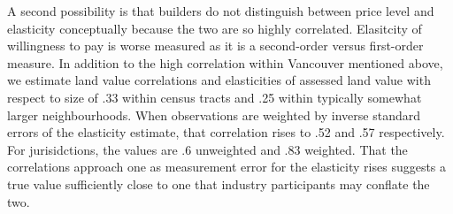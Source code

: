 \documentclass[12pt]{article}
\begin{document}
A second possibility is that builders do not distinguish between price level
and elasticity conceptually because the two are so highly correlated.
Elasitcity of willingness to pay is worse measured as it is a second-order
versus first-order measure. In addition to the high correlation within
Vancouver mentioned above, we estimate land value correlations and elasticities
of assessed land value with respect to size of .33 within census tracts and .25
within typically somewhat larger neighbourhoods. When observations are weighted
by inverse standard errors of the elasticity estimate, that correlation rises
to .52 and .57 respectively. For jurisidctions, the values are .6 unweighted
and .83 weighted. That the correlations approach one as measurement error for
the elasticity rises suggests a true value sufficiently close to one that
industry participants may conflate the two.
\end{document}
